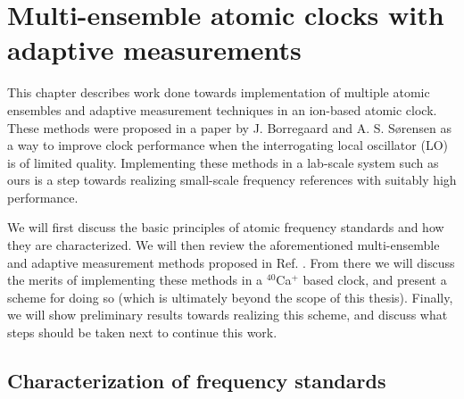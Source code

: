 \chapter{Multi-ensemble atomic clocks with adaptive measurements}

This chapter describes work done towards implementation of multiple atomic ensembles and adaptive measurement techniques in an ion-based atomic clock. These methods were proposed in a paper by J. Borregaard and A. S. S\o rensen \cite{BorregaardSorensen} as a way to improve clock performance when the interrogating local oscillator (LO) is of limited quality. Implementing these methods in a lab-scale  system such as ours is a step towards realizing small-scale frequency references with suitably high performance. 

We will first discuss the basic principles of atomic frequency standards and how they are characterized. We will then review the aforementioned multi-ensemble and adaptive measurement methods proposed in Ref. \cite{BorregaardSorensen}. From there we will discuss the merits of implementing these methods in a $^{40}$Ca$^+$ based clock, and present a scheme for doing so (which is ultimately beyond the scope of this thesis). Finally, we will show preliminary results towards realizing this scheme, and discuss what steps should be taken next to continue this work. 






\section{Characterization of frequency standards}

